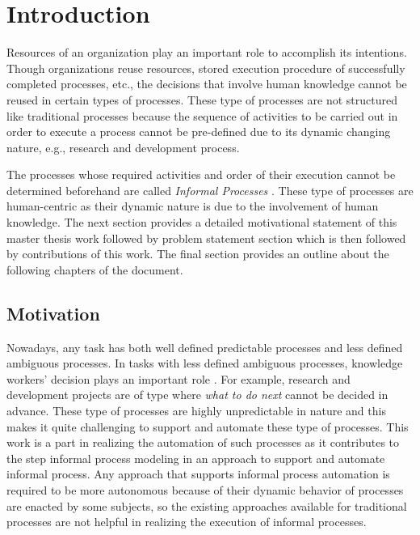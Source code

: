 \chapter{Introduction}
\label{chap:introduction}

Resources of an organization play an important role to accomplish its intentions. Though organizations reuse resources, stored execution procedure of successfully completed processes, etc., the decisions that involve human knowledge cannot be reused in certain types of processes. These type of processes are not structured like traditional processes because the sequence of activities to be carried out in order to execute a process cannot be pre-defined due to its dynamic changing nature, e.g., research and development process.

The processes whose required activities and order of their execution cannot be determined beforehand are called \textit{Informal Processes} \cite{Sungur2014}. These type of processes are human-centric as their dynamic nature is due to the involvement of human knowledge. The next section provides a detailed motivational statement of this master thesis work followed by problem statement section which is then followed by contributions of this work. The final section provides an outline about the following chapters of the document. 

\section{Motivation}
\label{sec:motivation}
Nowadays, any task has both well defined predictable processes and less defined ambiguous processes. In tasks with less defined ambiguous processes, knowledge workers' decision plays an important role \cite{BPTrends2009}. For example, research and development projects are of type where \textit{what to do next} cannot be decided in advance. These type of processes are highly unpredictable in nature and this makes it quite challenging to support and automate these type of processes. This work is a part in realizing the automation of such processes as it contributes to the step informal process modeling in an approach to support and automate informal process. Any approach that supports informal process automation is required to be more autonomous because of their dynamic behavior of processes are enacted by some subjects, so the existing approaches available for traditional processes are not helpful in realizing the execution of informal processes.  


